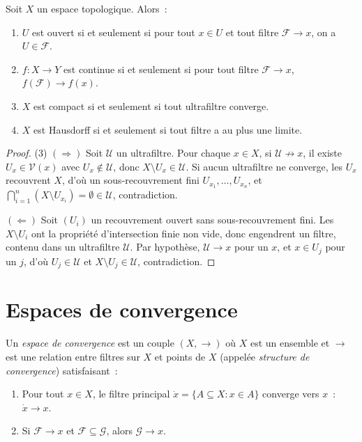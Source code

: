 \begin{theoreme}
Soit $X$ un espace topologique. Alors~:
\begin{enumerate}
  \item $U$ est ouvert si et seulement si pour tout $x \in U$ et tout filtre
    $\mathcal{F} \to x$, on a $U \in \mathcal{F}$.
  \item $f\colon X \to Y$ est continue si et seulement si pour tout filtre
    $\mathcal{F} \to x$, $f(\mathcal{F}) \to f(x)$.
  \item $X$ est compact si et seulement si tout ultrafiltre converge.
  \item $X$ est Hausdorff si et seulement si tout filtre a au plus une limite.
\end{enumerate}
\end{theoreme}

\begin{proof}
(3) $(\Rightarrow)$ Soit $\mathcal{U}$ un ultrafiltre. Pour chaque $x \in X$, si
$\mathcal{U} \not\to x$, il existe $U_x \in \mathcal{V}(x)$ avec $U_x \notin \mathcal{U}$,
donc $X \setminus U_x \in \mathcal{U}$. Si aucun ultrafiltre ne converge, les $U_x$
recouvrent $X$, d'o\`u un sous-recouvrement fini $U_{x_1}, \ldots, U_{x_n}$, et
$\bigcap_{i=1}^n (X \setminus U_{x_i}) = \emptyset \in \mathcal{U}$, contradiction.

$(\Leftarrow)$ Soit $(U_i)$ un recouvrement ouvert sans sous-recouvrement fini. Les
$X \setminus U_i$ ont la propri\'et\'e d'intersection finie non vide, donc engendrent un
filtre, contenu dans un ultrafiltre $\mathcal{U}$. Par hypoth\`ese, $\mathcal{U} \to x$
pour un $x$, et $x \in U_j$ pour un $j$, d'o\`u $U_j \in \mathcal{U}$ et
$X \setminus U_j \in \mathcal{U}$, contradiction.
\end{proof}

\section{Espaces de convergence}

\begin{definition}
Un \emph{espace de convergence} est un couple $(X, \to)$ o\`u $X$ est un ensemble et
$\to$ est une relation entre filtres sur $X$ et points de $X$ (appel\'ee \emph{structure
de convergence}) satisfaisant~:
\begin{enumerate}
  \item Pour tout $x \in X$, le filtre principal $\dot{x} = \{A \subseteq X : x \in A\}$
    converge vers $x$~: $\dot{x} \to x$.
  \item Si $\mathcal{F} \to x$ et $\mathcal{F} \subseteq \mathcal{G}$, alors
    $\mathcal{G} \to x$.
\end{enumerate}
\end{definition}

